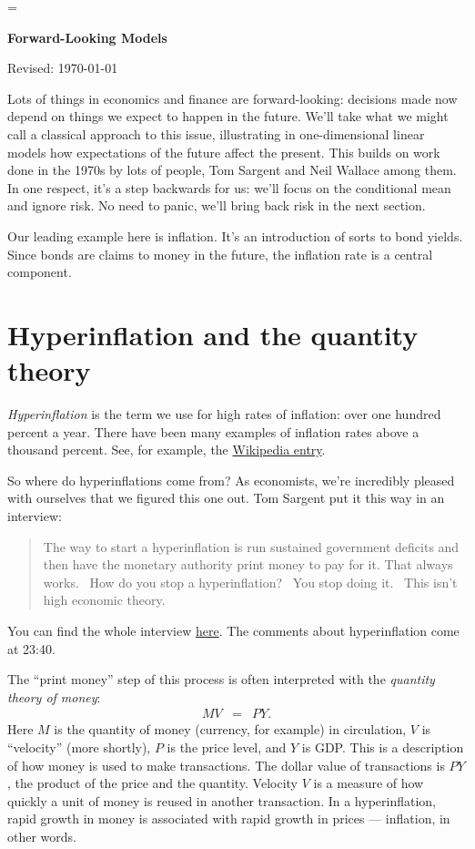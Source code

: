 \documentclass[11pt]{article}
\begin{document}
\parskip=\bigskipamount
\parindent=0.0in
\thispagestyle{empty}


\bigskip\bigskip
\centerline{\Large \bf Forward-Looking Models}
\centerline{Revised: \today}

\bigskip
Lots of things in economics and finance are forward-looking:
decisions made now depend on things we expect to happen in the future.
We'll take what we might call a classical approach to this issue,
illustrating in one-dimensional linear models how expectations of
the future affect the present.
This builds on work done in the 1970s by lots of people,
Tom Sargent and Neil Wallace among them.
In one respect, it's a step backwards for us:  we'll focus on the conditional mean
and ignore risk.
No need to panic, we'll bring back risk in the next section.

Our leading example here is inflation.
It's an introduction of sorts to bond yields.
Since bonds are claims to money in the future,
the inflation rate is a central component.


\section{Hyperinflation and the quantity theory}

{\it Hyperinflation\/} is the term we use for high rates of inflation:
over one hundred percent a year.
There have been many examples of inflation rates above a thousand percent.
See, for example, the
\href{http://en.wikipedia.org/wiki/Hyperinflation}{Wikipedia entry}.

So where do hyperinflations come from?
As economists, we're incredibly pleased with ourselves that we figured this one out.
Tom Sargent put it this way in an interview:
\begin{quote}
The way to start a hyperinflation is run sustained government deficits and then have the monetary authority print money to pay for it.  That always works.  How do you stop a hyperinflation?  You stop doing it.  This isn't high economic theory.
\end{quote}
You can find the whole interview
\href{http://youtu.be/bVIOClT4Rws}{here}.
The comments about hyperinflation come at 23:40.

The ``print money'' step of this process is often interpreted with the
{\it quantity theory of money\/}:
\begin{eqnarray*}
    M V &=& P Y .
\end{eqnarray*}
Here $M$ is the quantity of money (currency, for example) in circulation,
$V$ is ``velocity'' (more shortly),
$P$ is the price level, and $Y$ is GDP.
This is a description of how money is used to make transactions.
The dollar value of transactions is $PY$, the product of the price and the quantity.
Velocity $V$ is a measure of how quickly a unit of  money is reused in another transaction.
In a hyperinflation, rapid growth in money is associated
with rapid growth in prices --- inflation, in other words.
\end{document}
